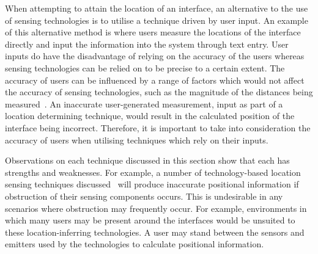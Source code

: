 \documentclass{bmcart}
\begin{document}
When attempting to attain the location of an interface, an alternative to the use of sensing technologies is to utilise a technique driven by user input.
An example of this alternative method is where users measure the locations of the interface directly and input the information into the system through text entry. 
User inputs do have the disadvantage of relying on the accuracy of the users whereas sensing technologies can be relied on to be precise to a certain extent.
The accuracy of users can be influenced by a range of factors which would not affect the accuracy of sensing technologies, such as the magnitude of the distances being measured~\cite{Al-Imam2006}.
An inaccurate user-generated measurement, input as part of a location determining technique, would result in the calculated position of the interface being incorrect.
Therefore, it is important to take into consideration the accuracy of users when utilising techniques which rely on their inputs.

Observations on each technique discussed in this section show that each has strengths and weaknesses.
For example, a number of technology-based location sensing techniques discussed~\cite{Bose1990,Lee2004,Kortuem2005,Ni2004} will produce inaccurate positional information if obstruction of their sensing components occurs.
This is undesirable in any scenarios where obstruction may frequently occur.
For example, environments in which many users may be present around the interfaces would be unsuited to these location-inferring technologies.
A user may stand between the sensors and emitters used by the technologies to calculate positional information.
\end{document}

